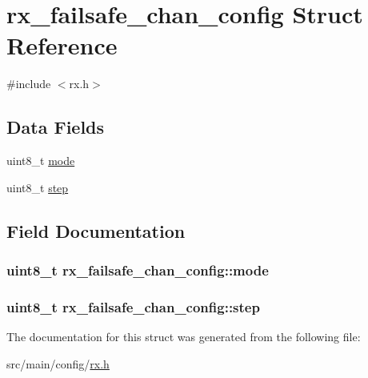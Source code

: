 \hypertarget{structrx__failsafe__chan__config}{\section{rx\+\_\+failsafe\+\_\+chan\+\_\+config Struct Reference}
\label{structrx__failsafe__chan__config}
}


{\ttfamily \#include $<$rx.\+h$>$}

\subsection*{Data Fields}
\begin{DoxyCompactItemize}
\item 
uint8\+\_\+t \hyperlink{structrx__failsafe__chan__config_a55435b837ddef39979de3f26f36b6859}{mode}
\item 
uint8\+\_\+t \hyperlink{structrx__failsafe__chan__config_a1f43dbbc1f2c7f3feb0c80370fe5dc84}{step}
\end{DoxyCompactItemize}


\subsection{Field Documentation}
\hypertarget{structrx__failsafe__chan__config_a55435b837ddef39979de3f26f36b6859}{
\subsubsection[{mode}]{\setlength{\rightskip}{0pt plus 5cm}uint8\+\_\+t rx\+\_\+failsafe\+\_\+chan\+\_\+config\+::mode}}\label{structrx__failsafe__chan__config_a55435b837ddef39979de3f26f36b6859}
\hypertarget{structrx__failsafe__chan__config_a1f43dbbc1f2c7f3feb0c80370fe5dc84}{
\subsubsection[{step}]{\setlength{\rightskip}{0pt plus 5cm}uint8\+\_\+t rx\+\_\+failsafe\+\_\+chan\+\_\+config\+::step}}\label{structrx__failsafe__chan__config_a1f43dbbc1f2c7f3feb0c80370fe5dc84}


The documentation for this struct was generated from the following file\+:\begin{DoxyCompactItemize}
\item 
src/main/config/\hyperlink{config_2rx_8h}{rx.\+h}\end{DoxyCompactItemize}
